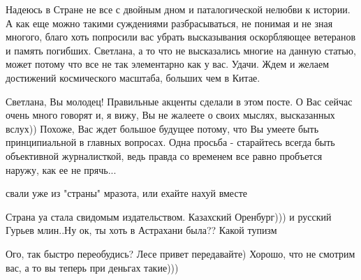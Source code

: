 \begin{itemize}
 
Надеюсь в Стране не все с двойным дном и паталогической нелюбви к истории. А как еще можно такими суждениями разбрасываться, не понимая и не зная многого, благо хоть попросили вас убрать высказывания оскорбляющее ветеранов и память погибших. Светлана, а то что не высказались многие на данную статью, может потому что все не так элементарно как у вас. Удачи. Ждем и желаем достижений космического масштаба, больших чем в Китае.

 
Светлана, Вы молодец! Правильные акценты сделали в этом посте. О Вас сейчас очень много говорят и, я вижу, Вы не жалеете о своих мыслях, высказанных вслух)) Похоже, Вас ждет большое будущее потому, что Вы умеете быть принципиальной в главных вопросах. Одна просьба - старайтесь всегда быть объективной журналисткой, ведь правда со временем все равно пробъется наружу, как ее не прячь...

 
свали уже из "страны" мразота, или ехайте нахуй вместе

 
Страна уа стала свидомым издательством. Казахский Оренбург))) и русский Гурьев млин..Ну ок, ты хоть в Астрахани была?? Какой тупизм

 
Ого, так быстро переобудись? Лесе привет передавайте)
Хорошо, что не смотрим вас, а то вы теперь при деньгах такие)))


\end{itemize}
